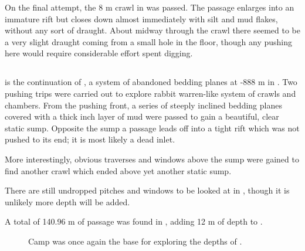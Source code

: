 On the final attempt, the 8 m crawl in  was passed.
The passage enlarges into an immature rift but closes down almost
immediately with silt and mud flakes, without any sort of draught. About
midway through the crawl there seemed to be a very slight draught coming
from a small hole in the floor, though any pushing here would require
considerable effort spent digging.


\subsection{}

 is the continuation of , a
system of abandoned bedding planes at -888 m in . Two
pushing trips were carried out to explore rabbit warren-like system of
crawls and chambers. From the  pushing front, a
series of steeply inclined bedding planes covered with a thick inch
layer of mud were passed to gain a beautiful, clear static sump.
Opposite the sump a passage leads off into a tight rift which was not
pushed to its end; it is most likely a dead inlet.

More interestingly, obvious traverses and windows above the sump were
gained to find another crawl which ended above yet another static sump.

There are still undropped pitches and windows to be looked at in
, though it is unlikely more depth will be added.

A total of 140.96 m of passage was found in ,
adding 12 m of depth to .


\begin{figure}[t!]
\checkoddpage \ifoddpage \forcerectofloat \else \forceversofloat \fi
{}
\caption{Camp \protect{} was once again the base for exploring the depths of . } \label{x-ray 2012}
\end{figure}



